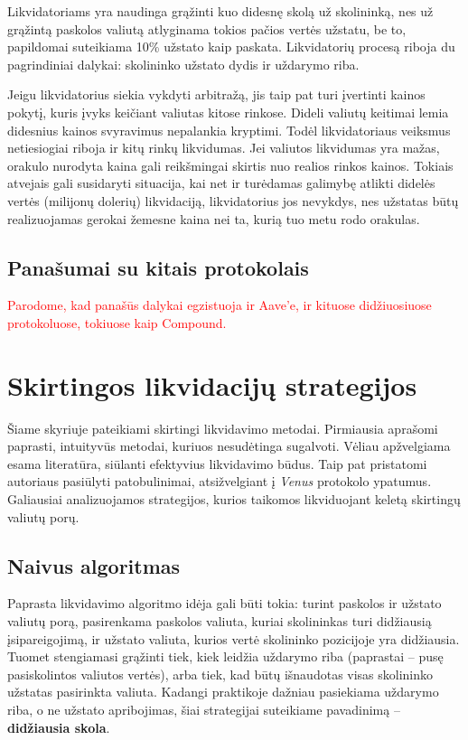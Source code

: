 \documentclass[]{VUMIFTemplateClass}
\begin{document}
Likvidatoriams yra naudinga grąžinti kuo didesnę skolą už skolininką, nes už grąžintą paskolos valiutą atlyginama tokios pačios vertės užstatu, be to, papildomai suteikiama 10\% užstato kaip paskata. Likvidatorių procesą riboja du pagrindiniai dalykai: skolininko užstato dydis ir uždarymo riba.

Jeigu likvidatorius siekia vykdyti arbitražą, jis taip pat turi įvertinti kainos pokytį, kuris įvyks keičiant valiutas kitose rinkose. Dideli valiutų keitimai lemia didesnius kainos svyravimus nepalankia kryptimi. Todėl likvidatoriaus veiksmus netiesiogiai riboja ir kitų rinkų likvidumas. Jei valiutos likvidumas yra mažas, orakulo nurodyta kaina gali reikšmingai skirtis nuo realios rinkos kainos. Tokiais atvejais gali susidaryti situacija, kai net ir turėdamas galimybę atlikti didelės vertės (milijonų dolerių) likvidaciją, likvidatorius jos nevykdys, nes užstatas būtų realizuojamas gerokai žemesne kaina nei ta, kurią tuo metu rodo orakulas. 

\subsection{Panašumai su kitais protokolais}
\textcolor{red}{
Parodome, kad panašūs dalykai egzistuoja ir Aave’e, ir kituose didžiuosiuose protokoluose, tokiuose kaip Compound.
}

\section{Skirtingos likvidacijų strategijos}
\label{sec:liq_strategijos}

Šiame skyriuje pateikiami skirtingi likvidavimo metodai. Pirmiausia aprašomi paprasti, intuityvūs metodai, kuriuos nesudėtinga sugalvoti. Vėliau apžvelgiama esama literatūra, siūlanti efektyvius likvidavimo būdus. Taip pat pristatomi autoriaus pasiūlyti patobulinimai, atsižvelgiant į \textit{Venus} protokolo ypatumus. Galiausiai analizuojamos strategijos, kurios taikomos likviduojant keletą skirtingų valiutų porų.

\subsection{Naivus algoritmas}
\label{sec:largest_borrow}

Paprasta likvidavimo algoritmo idėja gali būti tokia: turint paskolos ir užstato valiutų porą, pasirenkama paskolos valiuta, kuriai skolininkas turi didžiausią įsipareigojimą, ir užstato valiuta, kurios vertė skolininko pozicijoje yra didžiausia. Tuomet stengiamasi grąžinti tiek, kiek leidžia uždarymo riba (paprastai – pusę pasiskolintos valiutos vertės), arba tiek, kad būtų išnaudotas visas skolininko užstatas pasirinkta valiuta. Kadangi praktikoje dažniau pasiekiama uždarymo riba, o ne užstato apribojimas, šiai strategijai suteikiame pavadinimą – \textbf{didžiausia skola}.
\end{document}
